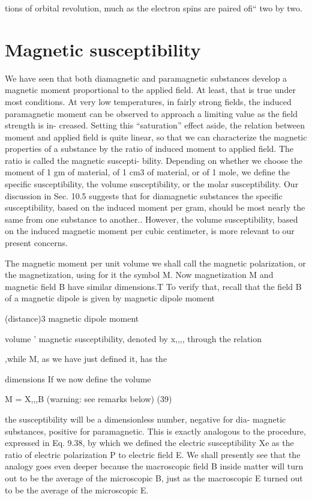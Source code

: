 {{tions of orbital revolution, much as the electron spins are paired ofi``
two by two.

\section{Magnetic susceptibility}

We have seen that both diamagnetic and paramagnetic substances
develop a magnetic moment proportional to the applied field. At
least, that is true under most conditions. At very low temperatures,
in fairly strong fields, the induced paramagnetic moment can be
observed to approach a limiting value as the field strength is in-
creased. Setting this ``saturation'' effect aside, the relation between
moment and applied field is quite linear, so that we can characterize
the magnetic properties of a substance by the ratio of induced
moment to applied field. The ratio is called the magnetic suscepti-
bility. Depending on whether we choose the moment of 1 gm of
material, of 1 cm3 of material, or of 1 mole, we define the specific
susceptibility, the volume susceptibility, or the molar susceptibility.
Our discussion in Sec. 10.5 suggests that for diamagnetic substances
the specific susceptibility, based on the induced moment per gram,
should be most nearly the same from one substance to another..
However, the volume susceptibility, based on the induced magnetic
moment per cubic centimeter, is more relevant to our present
concerns.

The magnetic moment per unit volume we shall call the magnetic
polarization, or the magnetization, using for it the symbol M. Now
magnetization M and magnetic field B have similar dimensions.T
To verify that, recall that the field B of a magnetic dipole is given by
magnetic dipole moment

(distance)3
magnetic dipole moment

volume '
magnetic susceptibility, denoted by x,,,, through the relation

,while M, as we have just defined it, has the

dimensions If we now define the volume

M = X,,,B (warning: see remarks below) (39)

the susceptibility will be a dimensionless number, negative for dia-
magnetic substances, positive for paramagnetic. This is exactly
analogous to the procedure, expressed in Eq. 9.38, by which we
defined the electric susceptibility Xe as the ratio of electric polarization
P to electric field E. We shall presently see that the analogy goes
even deeper because the macroscopic field B inside matter will turn
out to be the average of the microscopic B, just as the macroscopic E
turned out to be the average of the microscopic E.

}}
